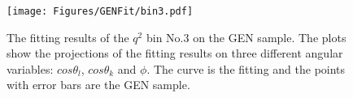 

\begin{figure}[!hbt]
  \centering
  \texttt{[image: Figures/GENFit/bin3.pdf]}
  \caption{The fitting results of the $q^2$ bin No.3 on the GEN
    sample. The plots show the projections of the fitting results on
    three different angular variables: $cos\theta_l$, $cos\theta_k$
    and $\phi$. The curve is the fitting and the points with error
    bars are the GEN  sample. } 
  \label{fig:gen-bin3}
\end{figure}




